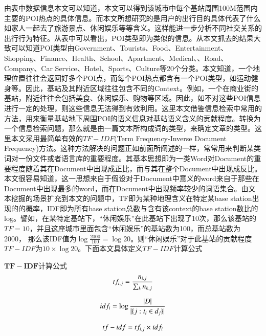 由表中数据信息本文可以知道，本文可以得到该城市中每个基站周围100M范围内主要的POI热点的具体信息。而本文所想研究的是用户的出行目的具体代表了什么如家人一起去了旅游景点、休闲娱乐等等含义。这样能进一步分析不同社交关系的出行行为特征。从表中可以看出，POI类型即为类似的信息。从本文抓去的结果大致可以知道POI类型由Government、Tourists、Food、Entertainment、Shopping、Finance、Health、School、Apartment、Medical、、Road、Company、Car Service、Hotel、Sports、Culture等20个分类。本文知道，一个地理位置往往会返回好多个POI点，而每个POI热点都含有一个POI类型，如运动健身等。因此，基站及其附近区域往往包含不同的Context。例如，一个在商业街的基站，附近往往会包括美食、休闲娱乐、购物等区域。因此，如不对这些POI信息进行一定的处理，则这些信息无法得到有效利用。这里本文借鉴信息检索中常用的方法，用来衡量基站地下周围POI的语义信息对基站语义含义的贡献程度。转换为一个信息检索问题，那么就是由一篇文本所构成词的类型，来确定文章的类型。这里本文采用最简单有效的$TF-IDF$(Term Frequency-Inverse Document Frequency)方法。这种方法解决的问题正如前面所阐述的一样，常常用来判断某类词对一份文件或者语言库的重要程度。其基本思想即为一类Word对Document的重要程度随着其在Document中出现成正比，而与其在整个Document中出现成反比。本文很容易知道，这一思想来自于假设对于Document中意义的word来自于那些在Document中出现最多的word，而在Document中出现频率较少的词语集合。由文本挖掘的场景扩充到本文的问题中，TF即为某种地理含义在特定某base station出现的的概率，IDF即为所有base station总数与含有该context的base station数比的log。譬如，在某特定基站下，“休闲娱乐”在此基站下出现了10次，那么该基站的$TF = 10$，并且这座城市里面包含“休闲娱乐”的基站数为100，而总基站数为2000， 那么该IDF值为$\log{\frac{2000}{100}} = \log{20}$。则“休闲娱乐”对于此基站的贡献程度$TF-IDF$为$10 \times \log{20}$。下面本文具体定义$TF-IDF$计算公式

\begin{definition}
    \label{TF-IDF-definition}
        $\bm{TF-IDF}$计算公式
    \begin{equation}
        tf_{i,j} = \frac{n_{i,j}}{\sum_{k}{n_{k,j}}}\\
    \end{equation}

    \begin{equation}
        idf_{i} = \log{\frac{|D|}{|\{j:t_i \in d_j\}|}}\\
    \end{equation}

    \begin{equation}
        tf-idf = tf_{i,j} \times idf_{i} \\
    \end{equation}
   
\end{definition}



